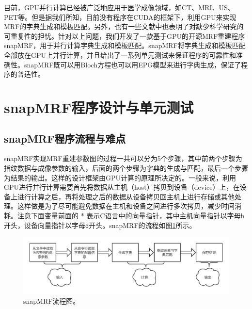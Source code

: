 目前，GPU并行计算已经被广泛地应用于医学成像领域，如CT\cite{biguri2016tigre,palenstijn2011performance}、MRI\cite{Knoll,Sorensen,tron,Eklund2014BROCCOLI,Xanthis2014MRISIMUL}、US\cite{Jung2013GPU,Yakang2010Real}、PET\cite{Garcia2016Accelerated,Cui2013Distributed}等。但是据我们所知，目前没有程序在CUDA的框架下，利用GPU来实现MRF的字典生成和模板匹配。另外，也有一些文献中也表明了对缺少科学研究的可重复性的担忧\cite{vasilevsy_repro_2013,osc_repro_2015,collins_repro_2014,begley_repro_2015}。针对以上问题，我们开发了一款基于GPU的开源MRF重建程序snapMRF，用于并行计算字典生成和模板匹配。snapMRF将字典生成和模板匹配全部放在GPU上并行计算，并且给出了一系列单元测试来保证程序的可靠性和准确性。snapMRF既可以用Bloch方程也可以用EPG模型来进行字典生成，保证了程序的普适性。

\section{snapMRF程序设计与单元测试}
\subsection{snapMRF程序流程与难点}
snapMRF实现MRF重建参数图的过程一共可以分为5个步骤，其中前两个步骤为指纹数据与成像参数的输入，后面的两个步骤为字典的生成与匹配，最后一个步骤为结果的输出。这样的设计框架由GPU计算的原理所决定的。一般来说，利用GPU进行并行计算需要首先将数据从主机（host）拷贝到设备（device）上，在设备上进行计算之后，再将处理之后的数据从设备拷贝回主机上进行存储或其他处理。这样做是为了尽可能避免数据在主机和设备之间进行多次拷贝，减少时间消耗。注意下面变量前面的 * 表示C语言中的向量指针，其中主机向量指针以字母\texttt{h}开头，设备向量指针以字母\texttt{d}开头。snapMRF的流程如图\ref{fig:snapmrf}所示。
\begin{figure}
\centering
 \includegraphics[width=1\textwidth]{img/snapmrf/snapMRF.png}
\caption{snapMRF流程图。}
\label{fig:snapmrf}
\end{figure}

